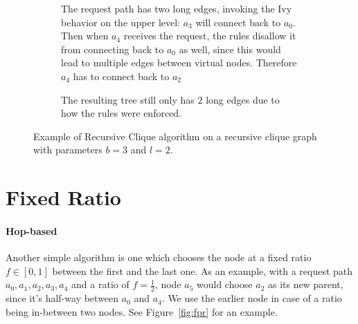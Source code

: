 \documentclass[a4paper, oneside]{discothesis}
\begin{document}
\begin{figure}
\begin{subfigure}[t]{0.5\textwidth}
\begin{tikzpicture}
\end{tikzpicture}
\caption{The request path has two long edges, invoking the Ivy behavior on the upper level: $a_{3}$ will connect back to $a_{0}$. Then when $a_{4}$ receives the request, the rules disallow it from connecting back to $a_{0}$ as well, since this would lead to multiple edges between virtual nodes. Therefore $a_{4}$ has to connect back to $a_{2}$}
\end{subfigure}
\quad
\begin{subfigure}[t]{0.5\textwidth}
\centering
{}
\caption{The resulting tree still only has $2$ long edges due to how the rules were enforced.}
\end{subfigure}
\caption{Example of Recursive Clique algorithm on a recursive clique graph with parameters $b=3$ and $l=2$.}
\label{fig:reclique-alg}
\end{figure}

\section{Fixed Ratio}

\paragraph{Hop-based}

Another simple algorithm is one which chooses the node at a fixed ratio $f\in[0,1]$ between the first and the last one. As an example, with a request path $a_{0},a_{1},a_{2},a_{3},a_{4}$ and a ratio of $f=\frac{1}{2}$, node $a_{5}$ would choose $a_{2}$ as its new parent, since it's half-way between $a_{0}$ and $a_{4}$. We use the earlier node in case of a ratio being in-between two nodes. See Figure~\ref{fig:fpr} for an example.
\end{document}
